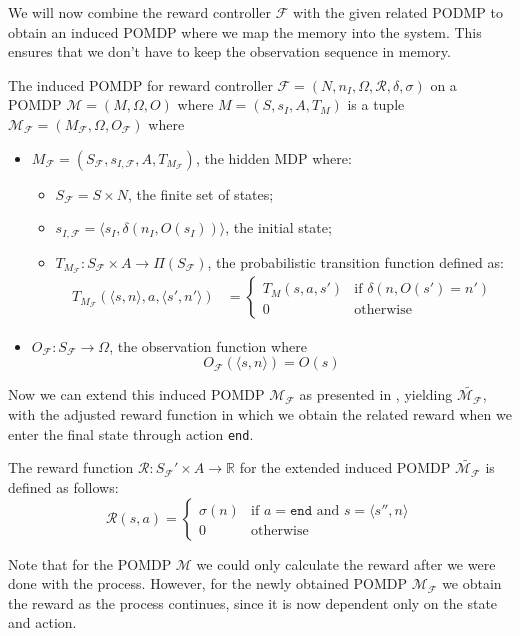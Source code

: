 We will now combine the reward controller $\mathcal{F}$ with the given related PODMP to obtain an induced POMDP where we map the memory into the system. This ensures that we don't have to keep the observation sequence in memory. 

\begin{definition}
	\label{def:induced-pomdp}
	The induced POMDP for reward controller $\mathcal{F}=(N, n_I, \Omega, \mathcal{R}, \delta, \sigma)$ on a POMDP $\mathcal{M}=(M,\Omega,O)$ where $M=(S,s_I,A,T_{M})$ is a tuple $\mathcal{M_\mathcal{F}}=(M_\mathcal{F},\Omega,O_\mathcal{F})$ where 
	\begin{itemize}
		\item $M_\mathcal{F} = (S_\mathcal{F},s_{I,\mathcal{F}}, A, T_{M_\mathcal{F}})$, the hidden MDP where:
		\begin{itemize}
			\item $S_\mathcal{F}=S\times N$, the finite set of states;
			\item $s_{I,\mathcal{F}} = \langle s_I, \delta(n_I, O(s_I))\rangle$, the initial state;
			\item $T_{M_\mathcal{F}}:S_\mathcal{F}\times A \to \Pi(S_\mathcal{F})$, the probabilistic transition function defined as:
				\begin{align*}				
					T_{M_\mathcal{F}}(\langle s,n\rangle,a,\langle s',n'\rangle) &= \begin{cases}
						T_M(s,a,s') & \text{if } \delta(n,O(s')=n') \\
						0 & \text{otherwise}
					\end{cases}
				\end{align*}
		\end{itemize}
		\item $O_\mathcal{F}:S_\mathcal{F}\to \Omega$, the observation function where 
		\[O_\mathcal{F}(\langle s,n \rangle) = O(s)\]
		\end{itemize}
\end{definition}

Now we can extend this induced POMDP $\mathcal{M}_\mathcal{F}$ as presented in , yielding $\widetilde{\mathcal{M}_\mathcal{F}}$, with the adjusted reward function in which we obtain the related reward when we enter the final state through action \texttt{end}.

\begin{definition}
	\label{def:reward-fuction-extended-induced-pomdp}
	The reward function $\mathcal{R}:S_\mathcal{F}'\times A\to \mathbb{R}$ for the extended induced POMDP $\widetilde{\mathcal{M}_{\mathcal{F}}}$ is defined as follows:
	\[\mathcal{R}(s,a) = \begin{cases}
		\sigma(n) & \text{if } a=\texttt{end} \text{ and } s=\langle s'',n\rangle \\
		0 & \text{otherwise} 
		\end{cases}
	\]
\end{definition}

Note that for the POMDP $\mathcal{M}$ we could only calculate the reward after we were done with the process. However, for the newly obtained POMDP $\mathcal{M}_{\mathcal{F}}$ we obtain the reward as the process continues, since it is now dependent only on the state and action.